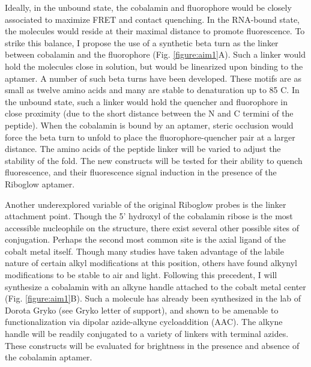 Ideally, in the unbound state, the cobalamin and fluorophore would be closely associated to maximize FRET and contact quenching.\cite{LeeDesignSynthesisCharacterization2009} In the RNA-bound state, the molecules would reside at their maximal distance to promote fluorescence. To strike this balance, I propose the use of a synthetic beta turn as the linker between cobalamin and the fluorophore (Fig. \ref{figure:aim1}A). Such a linker would hold the molecules close in solution, but would be linearized upon binding to the aptamer. A number of such beta turns have been developed. These motifs are as small as twelve amino acids and many are stable to denaturation up to 85 C.\cite{KierProbingLowerSize2008} In the unbound state, such a linker would hold the quencher and fluorophore in close proximity (due to the short distance between the N and C termini of the peptide). When the cobalamin is bound by an aptamer, steric occlusion would force the beta turn to unfold to place the fluorophore-quencher pair at a larger distance. The amino acids of the peptide linker will be varied to adjust the stability of the fold.  The new constructs will be tested for their ability to quench fluorescence, and their fluorescence signal induction in the presence of the Riboglow aptamer.

Another underexplored variable of the original Riboglow probes is the linker attachment point. Though the 5' hydroxyl of the cobalamin ribose is the most accessible nucleophile on the structure, there exist several other possible sites of conjugation. Perhaps the second most common site is the axial ligand of the cobalt metal itself. Though many studies have taken advantage of the labile nature of certain alkyl modifications at this position,\cite{ShellVitaminB12Tunable2015} others have found alkynyl modifications to be stable to air and light.\cite{ChrominskiReductionfreesynthesisstable2013,RuetzMarkusPhenylethynylcobalaminLightStable2013} Following this precedent, I will synthesize a cobalamin with an alkyne handle attached to the cobalt metal center (Fig. \ref{figure:aim1}B). Such a molecule has already been synthesized in the lab of Dorota Gryko (see Gryko letter of support), and shown to be amenable to functionalization via dipolar azide-alkyne cycloaddition (AAC).\cite{ChrominskiVitaminB12Derivatives2014} The alkyne handle will be readily conjugated to a variety of linkers with terminal azides.  These constructs will be evaluated for brightness in the presence and absence of the cobalamin aptamer.

